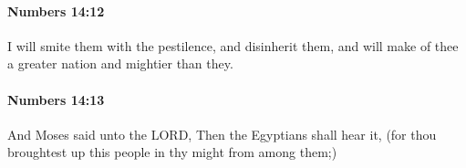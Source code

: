		\paragraph{Numbers 14:12} %
			\label{NUMBERS-14-12}

			I will smite them with the pestilence, and disinherit them, and will make of thee a greater nation and mightier than they.


		\paragraph{Numbers 14:13} %
			\label{NUMBERS-14-13}

			And Moses said unto the LORD, Then the Egyptians shall hear it, (for thou broughtest up this people in thy might from among them;)



